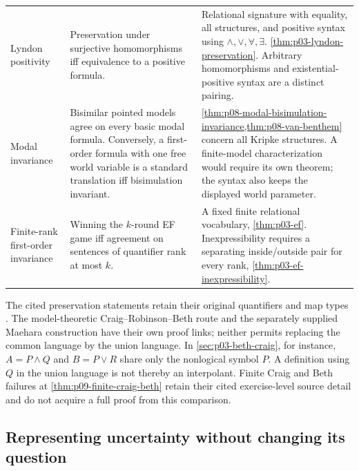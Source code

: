 \begin{longtable}{@{}p{}p{}p{}@{}}
Lyndon positivity & Preservation under surjective homomorphisms iff
equivalence to a positive formula. & Relational signature with equality,
all structures, and positive syntax using \(\land,\lor,\forall,\exists\).
\cref{thm:p03-lyndon-preservation}. Arbitrary homomorphisms and
existential-positive syntax are a distinct pairing. \\
Modal invariance & Bisimilar pointed models agree on every basic modal
formula. Conversely, a first-order formula with one free world variable
is a standard translation iff bisimulation invariant. &
\cref{thm:p08-modal-bisimulation-invariance,thm:p08-van-benthem} concern
all Kripke structures. A finite-model characterization would require its
own theorem; the syntax also keeps the displayed world parameter. \\
Finite-rank first-order invariance & Winning the \(k\)-round EF game
iff agreement on sentences of quantifier rank at most \(k\). & A fixed
finite relational vocabulary, \cref{thm:p03-ef}. Inexpressibility
requires a separating inside/outside pair for every rank,
\cref{thm:p03-ef-inexpressibility}. \\
\bottomrule
\end{longtable}

The cited preservation statements retain their original quantifiers and
map types \cite{ChangKeisler1990,Lyndon1959}. The model-theoretic
Craig--Robinson--Beth route and the separately supplied Maehara construction
have their own proof links; neither permits replacing the common language
by the union language. In \cref{sec:p03-beth-craig}, for instance,
\(A=P\land Q\) and \(B=P\lor R\) share only the nonlogical symbol
\(P\). A definition using \(Q\) in the union language is not thereby
an interpolant. Finite Craig and Beth failures at
\cref{thm:p09-finite-craig-beth} retain their cited exercise-level source
detail and do not acquire a full proof from this comparison.

\subsection{Representing uncertainty without changing its question}


